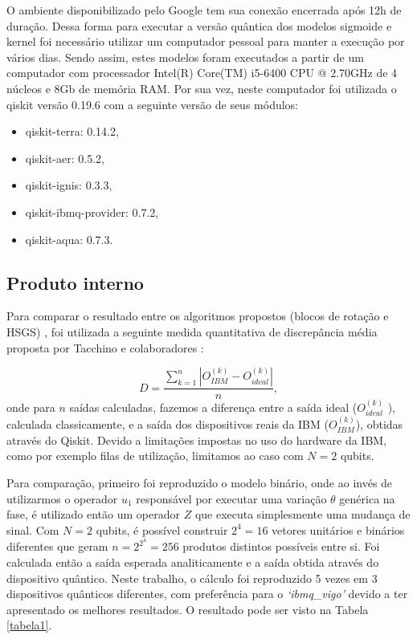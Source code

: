 O ambiente disponibilizado pelo Google tem sua conexão encerrada após 12h de duração. Dessa forma para executar a versão quântica dos modelos sigmoide e kernel foi necessário utilizar um computador pessoal para manter a execução por vários dias. Sendo assim, estes modelos foram executados a partir de um computador com processador Intel(R) Core(TM) i5-6400 CPU @ 2.70GHz de 4 núcleos e 8Gb de memória RAM. Por sua vez, neste computador foi utilizada o qiskit versão 0.19.6 com a seguinte versão de seus módulos:

\begin{itemize}
    \item qiskit-terra: 0.14.2, 
    \item qiskit-aer: 0.5.2, 
    \item qiskit-ignis: 0.3.3, 
    \item qiskit-ibmq-provider: 0.7.2, 
    \item qiskit-aqua: 0.7.3.
\end{itemize}

\subsection{Produto interno}

Para comparar o resultado entre os algoritmos propostos (blocos de rotação e HSGS) , foi utilizada a seguinte medida quantitativa  de discrepância média proposta por Tacchino e colaboradores \cite{Italiano}:

\begin{equation}D=\frac{\sum_{k=1}^{n}\left|O_{IBM}^{\left(k\right)}-O_{ideal}^{\left(k\right)}\right|}{n},\end{equation}
onde para $n$ saídas calculadas, fazemos a diferença entre a saída ideal ($O_{ideal}^{\left(k\right)}$  ), calculada classicamente, e a saída dos dispositivos reais da IBM ($O_{IBM}^{\left(k\right)}$), obtidas através do Qiskit.  Devido a limitações impostas no uso do hardware da IBM, como por exemplo filas de utilização, limitamos ao caso com $N=2$  qubits.

Para comparação, primeiro foi reproduzido o modelo binário, onde ao invés de utilizarmos o operador $u_{1}$ responsável por executar uma variação $\theta$ genérica na fase, é utilizado então um operador $Z$ que executa simplesmente uma mudança de sinal. Com $N=2$ qubits,  é possível construir $2^{4}=16$ vetores unitários e binários diferentes que geram $n=2^{2^{4}}=256$ produtos distintos possíveis entre si. Foi calculada então a saída esperada analiticamente e a saída obtida através do dispositivo quântico. Neste trabalho, o cálculo foi reproduzido 5 vezes em 3 dispositivos quânticos diferentes, com preferência para o \textit{`ibmq\_vigo'} devido a ter apresentado os melhores resultados. O resultado pode ser visto na Tabela \ref{tabela1}.

